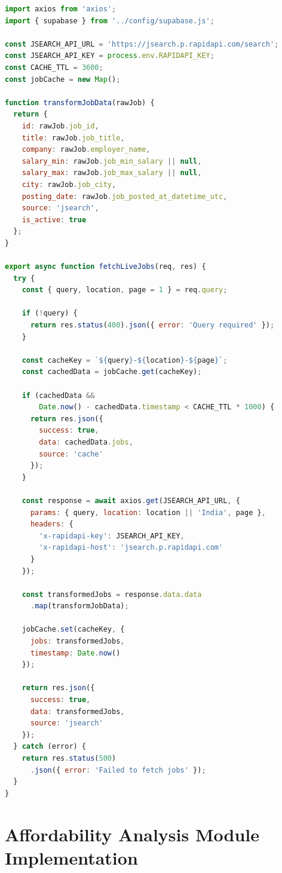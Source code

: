 \begin{lstlisting}[language=JavaScript, caption=Job Discovery Controller using JSearch API, label=lst:job_discovery]
import axios from 'axios';
import { supabase } from '../config/supabase.js';

const JSEARCH_API_URL = 'https://jsearch.p.rapidapi.com/search';
const JSEARCH_API_KEY = process.env.RAPIDAPI_KEY;
const CACHE_TTL = 3600;
const jobCache = new Map();

function transformJobData(rawJob) {
  return {
    id: rawJob.job_id,
    title: rawJob.job_title,
    company: rawJob.employer_name,
    salary_min: rawJob.job_min_salary || null,
    salary_max: rawJob.job_max_salary || null,
    city: rawJob.job_city,
    posting_date: rawJob.job_posted_at_datetime_utc,
    source: 'jsearch',
    is_active: true
  };
}

export async function fetchLiveJobs(req, res) {
  try {
    const { query, location, page = 1 } = req.query;
    
    if (!query) {
      return res.status(400).json({ error: 'Query required' });
    }

    const cacheKey = `${query}-${location}-${page}`;
    const cachedData = jobCache.get(cacheKey);
    
    if (cachedData && 
        Date.now() - cachedData.timestamp < CACHE_TTL * 1000) {
      return res.json({
        success: true,
        data: cachedData.jobs,
        source: 'cache'
      });
    }

    const response = await axios.get(JSEARCH_API_URL, {
      params: { query, location: location || 'India', page },
      headers: {
        'x-rapidapi-key': JSEARCH_API_KEY,
        'x-rapidapi-host': 'jsearch.p.rapidapi.com'
      }
    });

    const transformedJobs = response.data.data
      .map(transformJobData);
    
    jobCache.set(cacheKey, {
      jobs: transformedJobs,
      timestamp: Date.now()
    });

    return res.json({
      success: true,
      data: transformedJobs,
      source: 'jsearch'
    });
  } catch (error) {
    return res.status(500)
      .json({ error: 'Failed to fetch jobs' });
  }
}
\end{lstlisting}

\section{Affordability Analysis Module Implementation}


